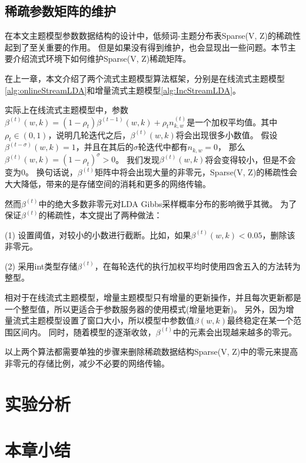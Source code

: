 \subsection{稀疏参数矩阵的维护}
在本文主题模型参数数据结构的设计中，低频词-主题分布表Sparse(V, Z)的稀疏性起到了至关重要的作用。
但是如果没有得到维护，也会显现出一些问题。本节主要介绍流式环境下如何维护Sparse(V, Z)稀疏矩阵。

在上一章，本文介绍了两个流式主题模型算法框架，分别是在线流式主题模型\ref{alg:onlineStreamLDA}和增量流式主题模型\ref{alg:IncStreamLDA}。

实际上在线流式主题模型中，参数$\beta^{(t)}(w, k) = (1 - \rho_t) \beta^{(t-1)}(w, k) + \rho_t n_{k, w}^{(t)}$是一个加权平均值。其中$\rho_t \in (0, 1)$，说明几轮迭代之后，$\beta^{(t)}(w, k)$将会出现很多小数值。
假设$\beta^{(t-\sigma)}(w, k) = 1$，并且在其后的$\sigma$轮迭代中都有$n_{k,w} = 0$，
那么$\beta^{(t)}(w, k) = (1 - \rho_t)^{\sigma} > 0 $。
我们发现$\beta^{(t)}(w, k)$将会变得较小，但是不会变为0。
换句话说，$\beta^{(t)}$矩阵中将会出现大量的非零元，Sparse(V, Z)的稀疏性会大大降低，带来的是存储空间的消耗和更多的网络传输。

然而$\beta^{(t)}$中的绝大多数非零元对LDA Gibbs采样概率分布的影响微乎其微。
为了保证$\beta^{(t)}$的稀疏性，本文提出了两种做法：

(1) 设置阈值，对较小的小数进行截断。比如，如果$\beta^{(t)}(w, k) < 0.05$，删除该非零元。

(2) 采用int类型存储$\beta^{(t)}$，在每轮迭代的执行加权平均时使用四舍五入的方法转为整型。

相对于在线流式主题模型，增量主题模型只有增量的更新操作，并且每次更新都是一个整型值，所以更适合于参数服务器的使用模式(增量地更新)。
另外，因为增量流式主题模型设置了窗口大小，所以模型中参数值$\beta(w, k)$最终稳定在某一个范围区间内。
同时，随着模型的逐渐收敛，$\beta^{(t)}$中的元素会出现越来越多的零元。

以上两个算法都需要单独的步骤来删除稀疏数据结构Sparse(V, Z)中的零元来提高非零元的存储比例，减少不必要的网络传输。


\section{实验分析}
\section{本章小结}
